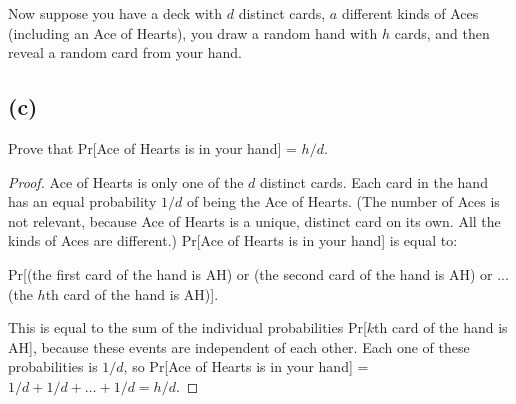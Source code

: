 \documentclass[14pt]{extarticle}
\begin{document}
Now suppose you have a deck with $d$ distinct cards, $a$ different kinds of Aces (including an Ace of Hearts), you draw a random hand with $h$ cards, and then reveal a random card from your hand.

\subsection{(c)}
Prove that Pr[Ace of Hearts is in your hand] = $h/d$.
\begin{proof}
Ace of Hearts is only one of the $d$ distinct cards. Each card in the hand has an equal probability $1/d$ of being the Ace of Hearts. (The number of Aces is not relevant, because Ace of Hearts is a unique, distinct card on its own. All the kinds of Aces are different.) Pr[Ace of Hearts is in your hand] is equal to:

Pr[(the first card of the hand is AH) or (the second card of the hand is AH) or ... (the $h$th card of the hand is AH)].

This is equal to the sum of the individual probabilities Pr[$k$th card of the hand is AH], because these events are independent of each other. Each one of these probabilities is $1/d$, so Pr[Ace of Hearts is in your hand] = $1/d + 1/d + \ldots + 1/d = h/d$.
\end{proof}
\end{document}
